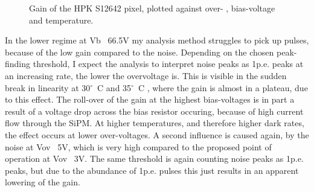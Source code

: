 \documentclass[12pt,article,type=msc,colorback,accentcolor=tud9c]{tudthesis}
\begin{document}
\begin{figure}[h]
\begin{centering}
\caption{Gain of the HPK S12642 pixel, plotted against over- , bias-voltage and temperature. }
\label{fig:S12642_Gain}
\end{centering}
\end{figure}
In the lower regime at Vb ~66.5V my analysis method struggles to pick up pulses, because of the low gain compared to the noise. Depending on the chosen peak-finding threshold, I expect the analysis to interpret noise peaks as 1p.e. peaks at an increasing rate, the lower the overvoltage is. This is visible in the sudden break in linearity at 30$^{\circ}$~C and 35$^{\circ}$~C , where the gain is almost in a plateau, due to this effect. The roll-over of the gain at the highest bias-voltages is in part a result of a voltage drop across the bias resistor occuring, because of high current flow through the SiPM. At higher temperatures, and therefore higher dark rates, the effect occurs at lower over-voltages. A second influence is caused again, by the noise at Vov ~5V, which is very high compared to the proposed point of operation at Vov ~3V. The same threshold is again counting noise peaks as 1p.e. peaks, but due to the abundance of 1p.e. pulses this just results in an apparent lowering of the gain.
\begin{figure}[h]
\begin{centering}
\caption{}
\label{fig:}
\end{centering}
\end{figure}
\end{document}
